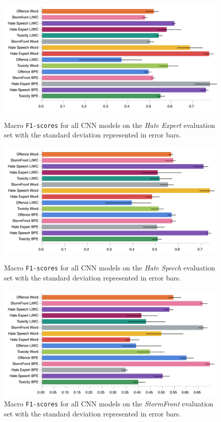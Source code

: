 \begin{figure}  
\begin{minipage}{\textwidth}  
\centering  
    \includegraphics[width=\textwidth]{all_cnn_waseem_test.pdf}  
    \caption{Macro \texttt{F1-scores} for all CNN models on the \textit{Hate Expert} evaluation set with the standard deviation represented in error bars.}  
    \label{fig:waseem_cnn_test}  
    \vfill  
    \includegraphics[width=\textwidth]{all_cnn_waseem_hovy_test.pdf}  
    \caption{Macro \texttt{F1-scores} for all CNN models on the \textit{Hate Speech} evaluation set with the standard deviation represented in error bars.}  
  \label{fig:waseem_hovy_cnn_test}  
\end{minipage}  
\end{figure}  
  
\begin{figure}  
    \centering  
    \includegraphics[width=\textwidth]{all_cnn_garcia_test.pdf}  
  \caption{Macro \texttt{F1-scores} for all CNN models on the \textit{StormFront} evaluation set with the standard deviation represented in error bars.}  
  \label{fig:garcia_cnn_test}  
\end{figure}  
  
